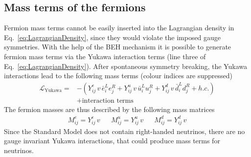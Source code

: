\subsection*{Mass terms of the fermions}
Fermion mass terms cannot be easily inserted into the Lagrangian density in Eq.~\eqref{eq:LagrangianDensity}, since they would violate the imposed gauge symmetries.
With the help of the BEH mechanism it is possible to generate fermion mass terms via the Yukawa interaction terms (line three of Eq.~\eqref{eq:LagrangianDensity}).
After spontaneous symmetry breaking, the Yukawa interactions lead to the following mass terms (colour indices are suppressed)
\begin{equation}
 \begin{split}
  \mathcal{L}_{\text{Yukawa}} = & - \left( Y^e_{ij}\, v\, \bar{e}^L_i  e^R_j + Y^u_{ij}\, v\, \bar{u}^L_i  u^R_j 
+ Y^d_{ij}\, v\, \bar{d}^L_i  d^R_j + h.c. \right) \\
    &+ \text{interaction terms}
 \end{split}
\end{equation}
The fermion masses are thus described by the following mass matrices
\begin{align}
 M_{ij}^e = Y_{ij}^e \, v && M_{ij}^u =  Y_{ij}^u \, v && M_{ij}^d =  Y_{ij}^d \, v 
\end{align}
Since the Standard Model does not contain right-handed neutrinos, there are no gauge invariant Yukawa interactions, that could produce mass terms for neutrinos.



